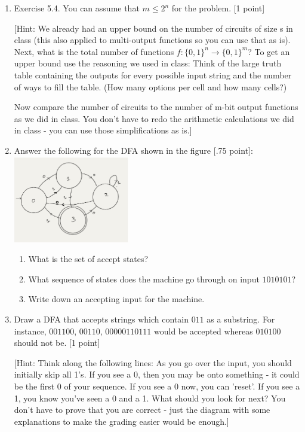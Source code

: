 \documentclass[11pt]{article}
\begin{document}
\begin{enumerate}
\item Exercise 5.4. You can assume that $m \leq 2^n$ for the problem. [1 point]

[Hint: We already had an upper bound on the number of circuits of size s in class (this also applied to multi-output functions so you can use that as is). Next, what is the total number of functions $f:\{0,1\}^n \rightarrow \{0,1\}^m$? To get an upper bound use the reasoning we used in class: Think of the large truth table containing the outputs for every possible input string and the number of ways to fill the table. (How many options per cell and how many cells?)

Now compare the number of circuits to the number of m-bit output functions as we did in class. You don't have to redo the arithmetic calculations we did in class - you can use those simplifications as is.]

\item Answer the following for the DFA shown in the figure [.75 point]:\\
\includegraphics[width=2in]{DFA}

\begin{enumerate}
\item What is the set of accept states?
\item What sequence of states does the machine go through on input $1010101$?
\item Write down an accepting input for the machine.
\end{enumerate}

\item Draw a DFA that accepts strings which contain $011$ as a substring. For instance, $001100$, $00110$, $00000110111$ would be accepted whereas $010100$ should not be. [1 point]

[Hint: Think along the following lines: As you go over the input, you should initially skip all 1's. If you see a 0, then you may be onto something - it could be the first 0 of your sequence. If you see a 0 now, you can 'reset'. If you see a 1, you know you've seen a 0 and a 1. What should you look for next? You don't have to prove that you are correct - just the diagram with some explanations to make the grading easier would be enough.]


\end{enumerate}
\end{document}
